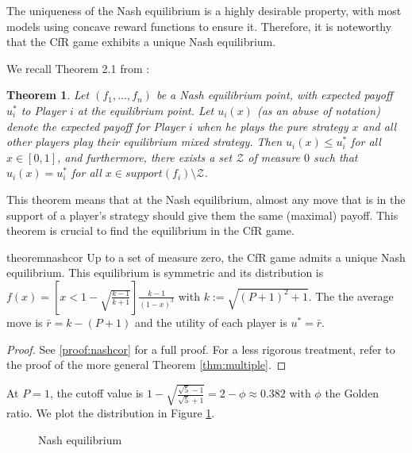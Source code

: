 \documentclass[preprint,12pt,authoryear]{elsarticle}
\newtheorem{theorem}{Theorem}[section]
\theoremstyle{definition}
\begin{document}
The uniqueness of the Nash equilibrium is a highly desirable property, with most models using concave reward functions to ensure it. Therefore, it is noteworthy that the CfR game exhibits a unique Nash equilibrium.

We recall Theorem 2.1 from \citet{Lotker2008-tx}:

\begin{theorem}
\label{thm:jules}
Let $(f_1, \ldots , f_n)$ be a Nash equilibrium point, with expected payoff $u_i^*$ to Player $i$ at the equilibrium point. Let $u_i(x)$ (as an abuse of notation) denote the expected payoff for Player $i$ when he plays the pure strategy $x$ and all other players play their equilibrium mixed strategy. Then $u_i(x) \leq u_i^*$ for all $x \in [0, 1]$, and furthermore, there exists a set $\mathcal{Z}$ of measure $0$ such that $u_i(x) = u_i^*$ for all $x \in support(f_i) \setminus \mathcal{Z}$.
\end{theorem}

This theorem means that at the Nash equilibrium, almost any move that is in the support of a player's strategy should give them the same (maximal) payoff. This theorem is crucial to find the equilibrium in the CfR game.

\begin{restatable}{theorem}{nashcor}
\label{thm:nashcor}
Up to a set of measure zero, the CfR game admits a unique Nash equilibrium. This equilibrium is symmetric and its distribution is $f(x) = \left[x < 1 - \sqrt{\frac{k - 1}{k + 1}}\right] \frac{ k - 1}{(1-x)^3}$ with $k := \sqrt{(P + 1)^2 + 1}$. The the average move is $\bar r = k - (P+1)$ and the utility of each player is $u^* = \bar r$.
\end{restatable}

\begin{proof}
    See \ref{proof:nashcor} for a full proof. For a less rigorous treatment, refer to the proof of the more general Theorem \ref{thm:multiple}.
\end{proof}

At $P = 1$, the cutoff value is $1 - \sqrt{\frac{\sqrt{5} - 1}{\sqrt{5} + 1}} = 2 - \phi \approx 0.382$ with $\phi$ the Golden ratio. We plot the distribution in Figure \ref{fig:nash}.


\begin{figure}[htbp]
  \centering
  \begin{minipage}[t]{0.48\textwidth}
    \centering
    
  \end{minipage}
  \hfill
  \begin{minipage}[t]{0.48\textwidth}
    \centering
    
  \end{minipage}
  \caption{Nash equilibrium}
  \label{fig:nash}
\end{figure}
\end{document}
